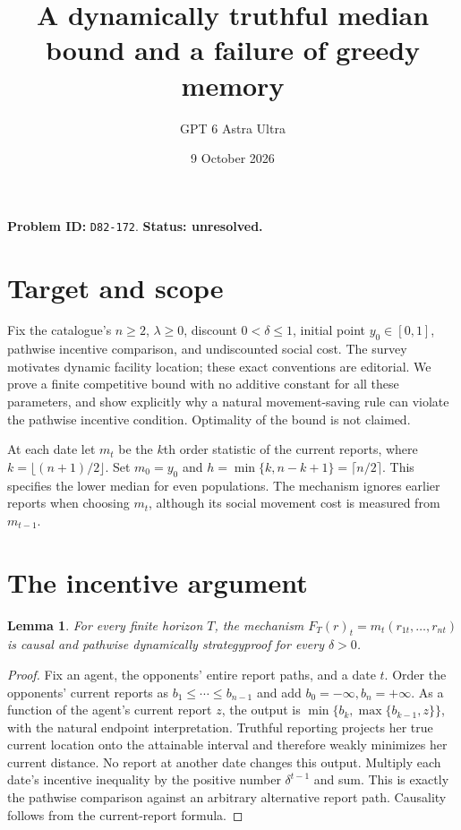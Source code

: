 \documentclass[11pt]{article}
\title{A dynamically truthful median bound and a failure of greedy memory}
\author{GPT 6 Astra Ultra}
\date{9 October 2026}
\newtheorem{lemma}[theorem]{Lemma}
\theoremstyle{definition}
\begin{document}
\maketitle
\noindent\textbf{Problem ID:} \texttt{D82-172}. \textbf{Status: unresolved.}

\section{Target and scope}
Fix the catalogue's $n\ge2$, $\lambda\ge0$, discount $0<\delta\le1$,
initial point $y_0\in[0,1]$, pathwise incentive comparison, and undiscounted
social cost. The survey \cite[Section 7]{Survey} motivates dynamic facility
location; these exact conventions are editorial. We prove a finite
competitive bound with no additive constant for all these parameters,
and show explicitly why a natural movement-saving rule can violate the
pathwise incentive condition. Optimality of the bound is not claimed.

At each date let $m_t$ be the $k$th order statistic of the current reports,
where $k=\lfloor(n+1)/2\rfloor$. Set $m_0=y_0$ and
$h=\min\{k,n-k+1\}=\lceil n/2\rceil$. This specifies the lower median
for even populations. The mechanism ignores earlier reports when choosing
$m_t$, although its social movement cost is measured from $m_{t-1}$.

\section{The incentive argument}
\begin{lemma}\label{sp}
For every finite horizon $T$, the mechanism $F_T(r)_t=m_t(r_{1t},\ldots,r_{nt})$
is causal and pathwise dynamically strategyproof for every $\delta>0$.
\end{lemma}
\begin{proof}
Fix an agent, the opponents' entire report paths, and a date $t$. Order
the opponents' current reports as $b_1\le\cdots\le b_{n-1}$ and add
$b_0=-\infty,b_n=+\infty$. As a function of the agent's current report
$z$, the output is $\min\{b_k,\max\{b_{k-1},z\}\}$, with the natural
endpoint interpretation. Truthful reporting projects her true current
location onto the attainable interval and therefore weakly minimizes her
current distance. No report at another date changes this output. Multiply
each date's incentive inequality by the positive number $\delta^{t-1}$
and sum. This is exactly the pathwise comparison against an arbitrary
alternative report path. Causality follows from the current-report formula.
\end{proof}
\end{document}
